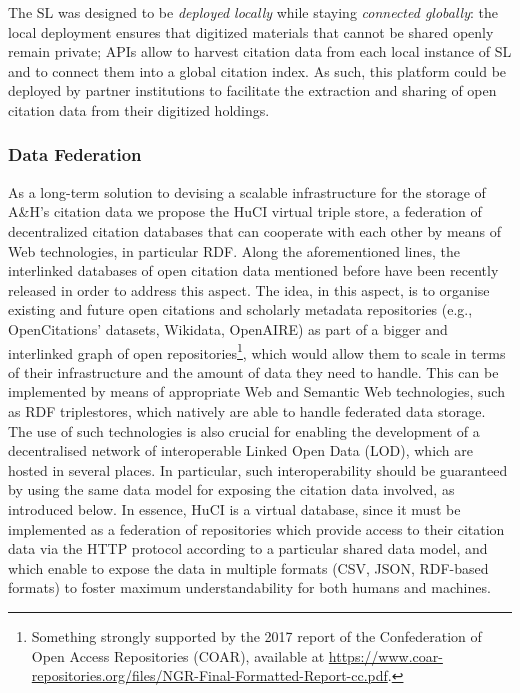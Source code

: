 The SL was designed to be \textit{deployed locally} while staying \textit{connected globally}: the local deployment ensures that digitized materials that cannot be shared openly remain private; APIs allow to harvest citation data from each local instance of SL and to connect them into a global citation index. As such, this platform could be deployed by partner institutions to facilitate the extraction and sharing of open citation data from their digitized holdings.


\subsubsection{Data Federation}

As a long-term solution to devising a scalable infrastructure for the storage of A\&H’s citation data we propose the HuCI virtual triple store, a federation of decentralized citation databases that can cooperate with each other by means of Web technologies, in particular RDF. Along the aforementioned lines, the interlinked databases of open citation data mentioned before have been recently released in order to address this aspect. The idea, in this aspect, is to organise existing and future open citations and scholarly metadata repositories (e.g., OpenCitations’ datasets, Wikidata, OpenAIRE) as part of a bigger and interlinked graph of open repositories\footnote{Something strongly supported by the 2017 report of the Confederation of Open Access Repositories (COAR), available at \url{https://www.coar-repositories.org/files/NGR-Final-Formatted-Report-cc.pdf}.}, which would allow them to scale in terms of their infrastructure and the amount of data they need to handle. This can be implemented by means of appropriate Web and Semantic Web technologies, such as RDF triplestores, which natively are able to handle federated data storage. The use of such technologies is also crucial for enabling the development of a decentralised network of interoperable Linked Open Data (LOD), which are hosted in several places. In particular, such interoperability should be guaranteed by using the same data model for exposing the citation data involved, as introduced below. In essence, HuCI is a virtual database, since it must be implemented as a federation of repositories which provide access to their citation data via the HTTP protocol according to a particular shared data model, and which enable to expose the data in multiple formats (CSV, JSON, RDF-based formats) to foster maximum understandability for both humans and machines. 

